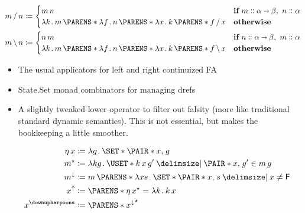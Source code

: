 \documentclass[10pt,fleqn]{article}
\begin{document}
\setlength\abovedisplayskip{0pt}
\setlength\belowdisplayskip{0pt}
\setlength\abovedisplayshortskip{0pt}
\setlength\belowdisplayshortskip{0pt}


\begin{minipage}[t]{0.365\textwidth} %
\begin{spreadlines}{0pt}
\begin{align*}
  m \fsl n
  &\coloneq
  \begin{cases}
    m\,n
    &\textbf{if}\ m \dblcolon \alpha\sto\beta,\ n \dblcolon \alpha \\
    \l k \dt m\,\p{\l f \dt n\,\p{\l x \dt k\,\p{f \fsl x}}}
    &\textbf{otherwise}
  \end{cases} \\
  m \bsl n
  &\coloneq
  \begin{cases}
    n\,m
    &\textbf{if}\ n \dblcolon \alpha\sto\beta,\ m \dblcolon \alpha \\
    \l k \dt m\,\p{\l f \dt n\,\p{\l x \dt k\,\p{f \bsl x}}}
    &\textbf{otherwise}
  \end{cases}
\end{align*}
\end{spreadlines}
\end{minipage}
%
%
\begin{minipage}[t]{0.35\textwidth}
\begin{itemize}
  \item
    The usual applicators for left and right continuized FA
  \item
    State.Set monad combinators for managing drefs
  \item
    A slightly tweaked lower operator to filter out falsity (more like
    traditional standard dynamic semantics). This is not essential, but makes
    the bookkeeping a little smoother.
\end{itemize}
\end{minipage}
%
\hspace{0.35em}
%
\begin{minipage}[t]{0.25\textwidth} %
\begin{spreadlines}{0pt}
\begin{align*}
  &&
  \eta\,x &\coloneq
  \l g \dt \set{\pair{x}{g}} \\
  &&
  m^{\bind} &\coloneq
  \l kg \dt \uset{k\,x\,g' \giv \pair{x}{g'} \in m\,g} \\
  &&
  m^\dnar &\coloneq
  m\,\p{\l xs \dt \set{\pair{x}{s} \giv x \neq \cn{F}}} \\
  &&
  x^\upar &\coloneq
  \p{\eta\,x}^{\bind} = \l k \dt k\,x \\
  &&
  x^\reset &\coloneq
  \p{x^\dnar}^{\bind}
\end{align*}
\end{spreadlines}
\end{minipage}
\end{document}
